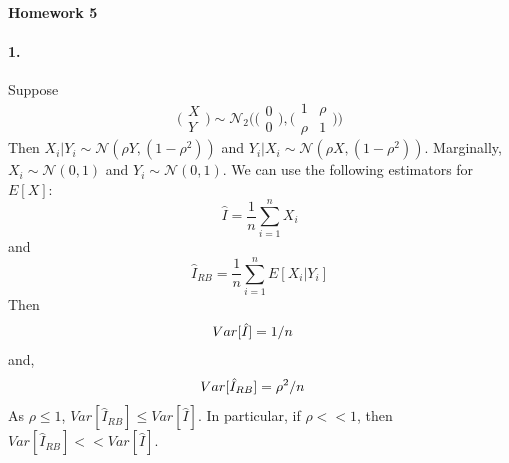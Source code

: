 \documentclass[12pt, leqno]{article}
\providecommand{\normd}{\mathcal{N}} %
\begin{document}
\pagestyle{fancy}

\begin{center}
{\large {\bf Homework 5}} \\
\end{center}
\paragraph{1.}Suppose 
\[
\bigg( \begin{matrix} X \\ Y \end{matrix}\bigg)  \sim \normd_2 \Bigg( \bigg(\begin{matrix} 0 \\
  0 \end{matrix}\bigg) , \bigg(\begin{matrix} 1 & \rho \\ \rho &
  1 \end{matrix}\bigg)\Bigg) 
\]
Then $X_i|Y_i \sim \normd(\rho Y, (1-\rho ^2))$ 
and $Y_i|X_i \sim \normd (\rho X, (1-\rho ^2))$. Marginally, $X_i \sim \normd (0,1)$ and
$Y_i \sim \normd (0,1)$. We can use the following estimators for $E[X]$:
\[
\hat{I} = \frac{1}{n} \sum_{i=1}^n X_i
\]
and 
\[
\hat{I}_{RB} = \frac{1}{n} \sum_{i=1}^n E[X_i|Y_i]
\]
Then
\begin{align}
Var[\hat{I}] & = 1/n \notag
\end{align}
and,
\begin{align}
Var[\hat{I}_{RB}] &= \rho^2/n \notag
\end{align}
As
$\rho \leq 1$, $Var[\hat{I}_{RB}] \leq Var[\hat{I}]$. In particular, if
$\rho << 1$, then $Var[\hat{I}_{RB}] << Var[\hat{I}]$.
\end{document}
